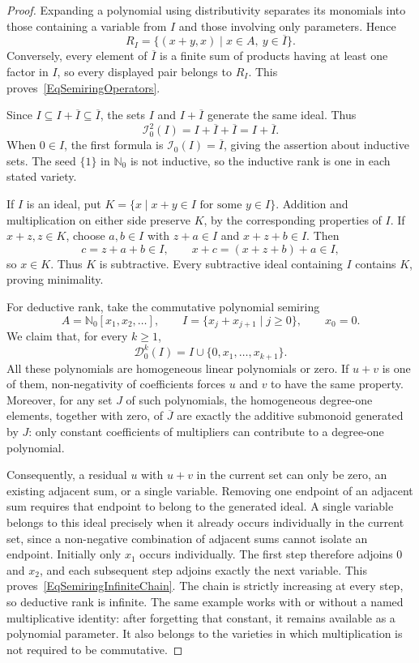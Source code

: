\documentclass[12pt,english]{amsart}
\theoremstyle{definition}
\numberwithin{equation}{section}
\theoremstyle{remark}
\begin{document}
\begin{proof}
Expanding a polynomial using distributivity separates its monomials into those containing a variable from $I$ and those involving only parameters. Hence
\[
R_I=\{(x+y,x)\mid x\in A,\ y\in\overline I\}.
\]
Conversely, every element of $\overline I$ is a finite sum of products having at least one factor in $I$, so every displayed pair belongs to $R_I$. This proves~\eqref{EqSemiringOperators}.

Since $I\subseteq I+\overline I\subseteq\overline I$, the sets $I$ and $I+\overline I$ generate the same ideal. Thus
\[
\mathcal I_0^2(I)=I+\overline I+\overline I=I+\overline I.
\]
When $0\in I$, the first formula is $\mathcal I_0(I)=\overline I$, giving the assertion about inductive sets. The seed $\{1\}$ in $\mathbb N_0$ is not inductive, so the inductive rank is one in each stated variety.

If $I$ is an ideal, put $K=\{x\mid x+y\in I\text{ for some }y\in I\}$. Addition and multiplication on either side preserve $K$, by the corresponding properties of $I$. If $x+z,z\in K$, choose $a,b\in I$ with $z+a\in I$ and $x+z+b\in I$. Then
\[
c=z+a+b\in I,\qquad x+c=(x+z+b)+a\in I,
\]
so $x\in K$. Thus $K$ is subtractive. Every subtractive ideal containing $I$ contains $K$, proving minimality.

For deductive rank, take the commutative polynomial semiring
\[
A=\mathbb N_0[x_1,x_2,\ldots],\qquad
I=\{x_j+x_{j+1}\mid j\geqslant0\},\qquad x_0=0.
\]
We claim that, for every $k\geqslant1$,
\begin{equation}\label{EqSemiringInfiniteChain}
\mathcal D_0^k(I)=I\cup\{0,x_1,\ldots,x_{k+1}\}.
\end{equation}
All these polynomials are homogeneous linear polynomials or zero. If
$u+v$ is one of them, non-negativity of coefficients forces $u$ and
$v$ to have the same property. Moreover, for any set $J$ of such
polynomials, the homogeneous degree-one elements, together with zero,
of $\overline J$ are exactly the additive submonoid generated by $J$:
only constant coefficients of multipliers can contribute to a
degree-one polynomial.

Consequently, a residual $u$ with $u+v$ in the current set can only
be zero, an existing adjacent sum, or a single variable. Removing one
endpoint of an adjacent sum requires that endpoint to belong to the
generated ideal. A single variable belongs to this ideal precisely
when it already occurs individually in the current set, since a
non-negative combination of adjacent sums cannot isolate an endpoint.
Initially only $x_1$ occurs individually. The first step therefore
adjoins $0$ and $x_2$, and each subsequent step adjoins exactly the
next variable. This proves~\eqref{EqSemiringInfiniteChain}. The chain
is strictly increasing at every step, so deductive rank is infinite.
The same example works with or without a named multiplicative
identity: after forgetting that constant, it remains available as a
polynomial parameter. It also belongs to the varieties in which
multiplication is not required to be commutative.
\end{proof}
\end{document}
